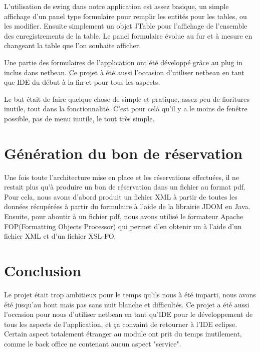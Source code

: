\documentclass[11pt,a4paper]{article}
\begin{document}
L'utilisation de swing dans notre application est assez basique, un simple affichage d'un panel type formulaire pour remplir les entités pour les tables, ou les modifier. Ensuite simplement un objet JTable pour l'affichage de l'ensemble des enregistrements de la table. Le panel formulaire évolue au fur et à mesure en changeant la table que l'on souhaite afficher. 

Une partie des formulaires de l'application ont été développé grâce au plug in inclus dans netbean. Ce projet à été aussi l'occasion d'utiliser netbean en tant que IDE du début à la fin et pour tous les aspects.

Le but était de faire quelque chose de simple et pratique, assez peu de fioritures inutile, tout dans la fonctionnalité. C'est pour celà qu'il y a le moins de fenêtre possible, pas de menu inutile, le tout très simple.


\section{Génération du bon de réservation}
Une fois toute l'architecture mise en place et les réservations effectuées, il
ne restait plus qu'à produire un bon de réservation dans un fichier au format
pdf.
Pour cela, nous avons d'abord produit un fichier XML à partir de toutes les
données récupérées à partir du formulaire à l'aide de la librairie JDOM en
Java. Ensuite, pour aboutir à un fichier pdf, nous avons utilisé le formateur
Apache FOP(Formatting Objects Processor) qui permet d'en obtenir un à l'aide
d'un fichier XML et d'un fichier XSL-FO.


\section{Conclusion}


Le projet était trop ambitieux pour le temps qu'ils nous à été imparti, nous avons été jusqu'au bout mais pas sans nuit blanche et difficultés. Ce projet a été aussi l'occasion pour nous d'utiliser netbean en tant qu'IDE pour le développement de tous les aspects de l'application, et ça convaint de retourner à l'IDE eclipse. Certain aspect totalement étranger au module ont prit du temps inutilement, comme le back office ne contenant aucun aspect "service".
\end{document}
